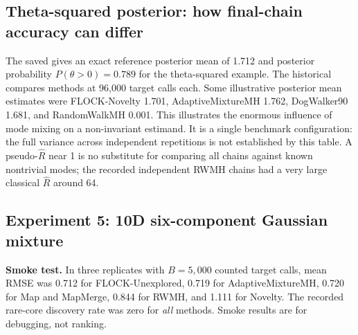 \documentclass[11pt,letterpaper]{article}
\begin{document}
\subsection{Theta-squared posterior: how final-chain accuracy can differ}
The saved \protect{} gives an exact reference posterior mean of 1.712 and posterior probability \(P(\theta>0)=0.789\) for the theta-squared example. The historical \protect{} compares methods at 96,000 target calls each. Some illustrative posterior mean estimates were FLOCK-Novelty 1.701, AdaptiveMixtureMH 1.762, DogWalker90 1.681, and RandomWalkMH 0.001. This illustrates the enormous influence of mode mixing on a non-invariant estimand. It is a single benchmark configuration: the full variance across independent repetitions is not established by this table. A pseudo-\(\widehat R\) near 1 is no substitute for comparing all chains against known nontrivial modes; the recorded independent RWMH chains had a very large classical \(\widehat R\) around 64.

\subsection{Experiment 5: 10D six-component Gaussian mixture}
\textbf{Smoke test.} In three replicates with \(B=5{,}000\) counted target calls, mean RMSE was 0.712 for FLOCK-Unexplored, 0.719 for AdaptiveMixtureMH, 0.720 for Map and MapMerge, 0.844 for RWMH, and 1.111 for Novelty. The recorded rare-core discovery rate was zero for \emph{all} methods. Smoke results are for debugging, not ranking.
\end{document}
